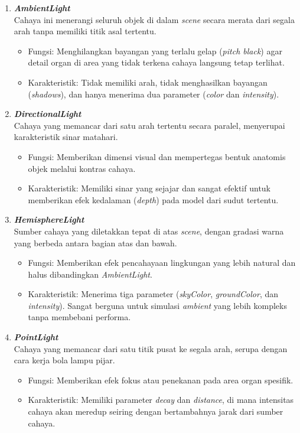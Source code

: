 \begin{enumerate}
    \item \textbf{\textit{AmbientLight}} \\
    Cahaya ini menerangi seluruh objek di dalam \textit{scene} secara merata dari segala arah tanpa memiliki titik asal tertentu.
    \begin{itemize}
        \item Fungsi: Menghilangkan bayangan yang terlalu gelap (\textit{pitch black}) agar detail organ di area yang tidak terkena cahaya langsung tetap terlihat.
        \item Karakteristik: Tidak memiliki arah, tidak menghasilkan bayangan (\textit{shadows}), dan hanya menerima dua parameter (\textit{color} dan \textit{intensity}).
    \end{itemize}

    \item \textbf{\textit{DirectionalLight}} \\
    Cahaya yang memancar dari satu arah tertentu secara paralel, menyerupai karakteristik sinar matahari.
    \begin{itemize}
        \item Fungsi: Memberikan dimensi visual dan mempertegas bentuk anatomis objek melalui kontras cahaya.
        \item Karakteristik: Memiliki sinar yang sejajar dan sangat efektif untuk memberikan efek kedalaman (\textit{depth}) pada model dari sudut tertentu.
    \end{itemize}
    

    \item \textbf{\textit{HemisphereLight}} \\
    Sumber cahaya yang diletakkan tepat di atas \textit{scene}, dengan gradasi warna yang berbeda antara bagian atas dan bawah.
    \begin{itemize}
        \item Fungsi: Memberikan efek pencahayaan lingkungan yang lebih natural dan halus dibandingkan \textit{AmbientLight}.
        \item Karakteristik: Menerima tiga parameter (\textit{skyColor}, \textit{groundColor}, dan \textit{intensity}). Sangat berguna untuk simulasi \textit{ambient} yang lebih kompleks tanpa membebani performa.
    \end{itemize}
    

    \item \textbf{\textit{PointLight}} \\
    Cahaya yang memancar dari satu titik pusat ke segala arah, serupa dengan cara kerja bola lampu pijar.
    \begin{itemize}
        \item Fungsi: Memberikan efek fokus atau penekanan pada area organ spesifik.
        \item Karakteristik: Memiliki parameter \textit{decay} dan \textit{distance}, di mana intensitas cahaya akan meredup seiring dengan bertambahnya jarak dari sumber cahaya.
    \end{itemize}
    


\end{enumerate}
